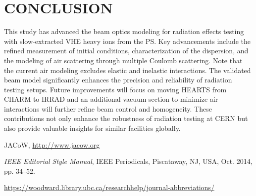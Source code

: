 \documentclass[a4paper,
               biblatex,     %
               ]{jacow}
\begin{document}






\section{CONCLUSION}

This study has advanced the beam optics modeling for radiation effects testing with slow-extracted VHE heavy ions from the PS. Key advancements include the refined measurement of initial conditions, characterization of the dispersion, and the modeling of air scattering through multiple Coulomb scattering. Note that the current air modeling excludes elastic and inelastic interactions. The validated beam model significantly enhances the precision and reliability of radiation testing setups. Future improvements will focus on moving HEARTS from CHARM to IRRAD and an additional vacuum section to minimize air interactions will further refine beam control and homogeneity. These contributions not only enhance the robustness of radiation testing at CERN but also provide valuable insights for similar facilities globally.


%
	{\printbibliography}%
	{%
	
	\begin{thebibliography}{9} %
	
		JACoW,
		\url{http://www.jacow.org}
	
		\textit{IEEE Editorial Style Manual},
		IEEE Periodicals, Piscataway,
		NJ, USA, Oct. 2014, pp. 34--52.

	\url{https://woodward.library.ubc.ca/researchhelp/journal-abbreviations/}

	\end{thebibliography}
} %
\end{document}
